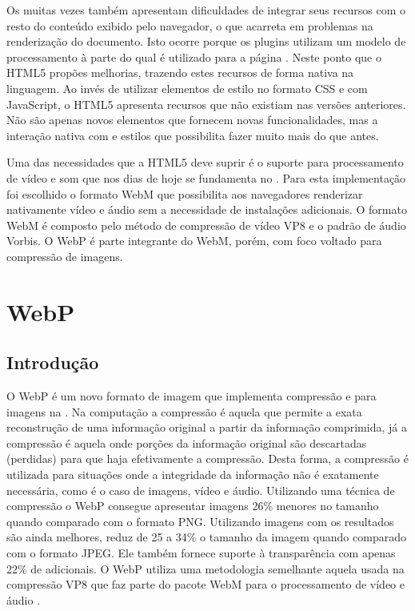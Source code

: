 \documentclass[espaco=simples,appendix=Name]{abnt}
\begin{document}
Os  muitas vezes também apresentam dificuldades de integrar seus recursos com o resto do conteúdo exibido pelo navegador, o que acarreta em problemas na renderização do documento. Isto ocorre porque os plugins utilizam um modelo de processamento à parte do qual é utilizado para a página . Neste ponto que o HTML5 propões melhorias, trazendo estes recursos de forma nativa na linguagem. Ao invés de utilizar elementos de estilo no formato CSS e  com JavaScript, o HTML5 apresenta recursos que não existiam nas versões anteriores. Não são apenas novos elementos que fornecem novas funcionalidades, mas a interação nativa com  e estilos que possibilita fazer muito mais do que antes.

Uma das necessidades que a HTML5 deve suprir é o suporte para processamento de vídeo e som que nos dias de hoje se fundamenta no . Para esta implementação foi escolhido o formato WebM que possibilita aos navegadores renderizar nativamente vídeo e áudio sem a necessidade de instalações adicionais. O formato WebM é composto pelo método de compressão de vídeo VP8 e o padrão de áudio Vorbis. O WebP é parte integrante do WebM, porém, com foco voltado para compressão de imagens.

\chapter{WebP}

\section{Introdução}

O WebP é um novo formato de imagem que implementa compressão  e  para imagens na . Na computação a compressão  é aquela que permite a exata reconstrução de uma informação original a partir da informação comprimida, já a compressão  é aquela onde porções da informação original são descartadas (perdidas) para que haja efetivamente a compressão. Desta forma, a compressão  é utilizada para situações onde a integridade da informação não é exatamente necessária, como é o caso de imagens, vídeo e áudio. Utilizando uma técnica de compressão  o WebP consegue apresentar imagens 26\% menores no tamanho quando comparado com o formato PNG. Utilizando imagens com  os resultados são ainda melhores, reduz de 25 a 34\% o tamanho da imagem quando comparado com o formato JPEG. Ele também fornece suporte à transparência com apenas 22\% de  adicionais. O WebP utiliza uma metodologia semelhante aquela usada na compressão VP8 que faz parte do pacote WebM para o processamento de vídeo e áudio \cite{WebPLossyStudy}.
\end{document}
